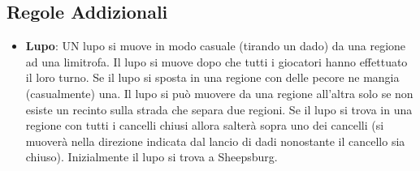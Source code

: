 \documentclass{article}
\begin{document}
\subsection{Regole Addizionali}
\label{RegoleAddizionali}
\begin{itemize}
\item \textbf{Lupo}: UN lupo si muove in modo casuale (tirando un dado) da una regione ad una limitrofa. Il lupo si muove dopo che tutti i giocatori hanno effettuato il loro turno. Se il lupo si sposta in una regione con delle pecore ne mangia (casualmente) una. Il lupo si pu\`o muovere da una regione all'altra solo se non esiste un recinto sulla strada che separa due regioni. Se il lupo si trova in una regione con tutti i cancelli chiusi allora salter\`a sopra uno dei cancelli (si muover\`a nella direzione indicata dal lancio di dadi nonostante il cancello sia chiuso). Inizialmente il lupo si trova a Sheepsburg.
\end{itemize}
\end{document}
